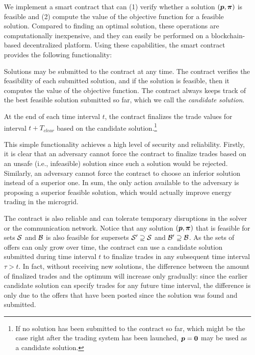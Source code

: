 We implement a smart contract that can (1) verify whether a solution $(\boldsymbol{p}, \boldsymbol{\pi})$ is feasible and (2) compute the value of the objective function for a feasible solution.
Compared to finding an optimal solution, these operations are computationally inexpensive, and they can easily be performed on a blockchain-based decentralized platform.
Using these capabilities, the smart contract provides the following functionality:
\begin{compactitem}
\item Solutions may be submitted to the contract at any time. 
The contract verifies the feasibility of each submitted solution, and if the solution is feasible, then it computes the value of the objective function.
The contract always keeps track of the best feasible solution submitted so far, which we call the \emph{candidate solution}.
\item At the end of each time interval $t$, the contract finalizes the trade values for interval $t + T_{clear}$ based on the candidate solution.\footnote{If no solution has been submitted to the contract so far, which might be the case right after the trading system has been launched, $\boldsymbol{p} = \boldsymbol{0}$ may be used as a candidate solution.}
\end{compactitem}

This simple functionality achieves a high level of security and reliability.
Firstly, it is clear that an adversary cannot force the contract to finalize trades based on an unsafe (i.e., infeasible) solution since such a solution would be rejected.
Similarly, an adversary cannot force the contract to choose an inferior solution instead of a superior one.
In sum, the only action available to the adversary is proposing a superior feasible solution, which would actually improve energy trading in the microgrid.

The contract is also reliable and can tolerate temporary disruptions in the solver or the communication network.
Notice that any solution $(\boldsymbol{p}, \boldsymbol{\pi})$ that is feasible for sets $\mathcal{S}$ and $\mathcal{B}$ is also feasible for supersets $\mathcal{S}' \supseteq \mathcal{S}$ and $\mathcal{B}' \supseteq \mathcal{B}$.
As the sets of offers can only grow over time, the contract can use a candidate solution submitted during time interval $t$ to finalize trades in any subsequent time interval $\tau > t$.
In fact, without receiving new solutions, the difference between the amount of finalized trades and the optimum will increase only gradually:
since the earlier candidate solution can specify trades for any future time interval,
the difference is only due to the offers that have been posted since the solution was found and submitted.

